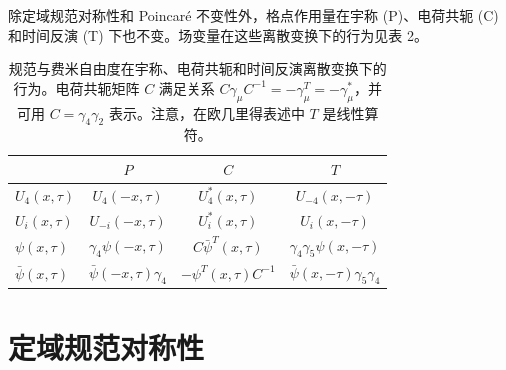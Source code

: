 除定域规范对称性和 Poincar\'e 不变性外，格点作用量在宇称 (P)、电荷共轭 (C) 和时间反演 (T) 下也不变。场变量在这些离散变换下的行为见表 2。

\begin{table}[htbp]
  \centering
  \begin{tabular}{lccc}
    \toprule
     & \(P\) & \(C\) & \(T\) \\
    \midrule
    \(U_4(x, \tau)\) & \(U_4(-x, \tau)\) & \(U_4^{*}(x, \tau)\) & \(U_{-4}(x, -\tau)\) \\
    \(U_i(x, \tau)\) & \(U_{-i}(-x, \tau)\) & \(U_i^{*}(x, \tau)\) & \(U_i(x, -\tau)\) \\
    \(\psi(x, \tau)\) & \(\gamma_4 \psi(-x, \tau)\) & \(C\bar{\psi}^{T}(x, \tau)\) & \(\gamma_4 \gamma_5 \psi(x, -\tau)\) \\
    \(\bar{\psi}(x, \tau)\) & \(\bar{\psi}(-x, \tau)\gamma_4\) & \(-\psi^{T}(x, \tau)C^{-1}\) & \(\bar{\psi}(x, -\tau)\gamma_5 \gamma_4\) \\
    \bottomrule
  \end{tabular}
  \caption{规范与费米自由度在宇称、电荷共轭和时间反演离散变换下的行为。电荷共轭矩阵 \(C\) 满足关系 \(C\gamma_\mu C^{-1} = -\gamma_\mu^{T} = -\gamma_\mu^{*}\)，并可用 \(C = \gamma_4 \gamma_2\) 表示。注意，在欧几里得表述中 \(T\) 是线性算符。}
  \label{tab:2}
\end{table}

\section{定域规范对称性}

